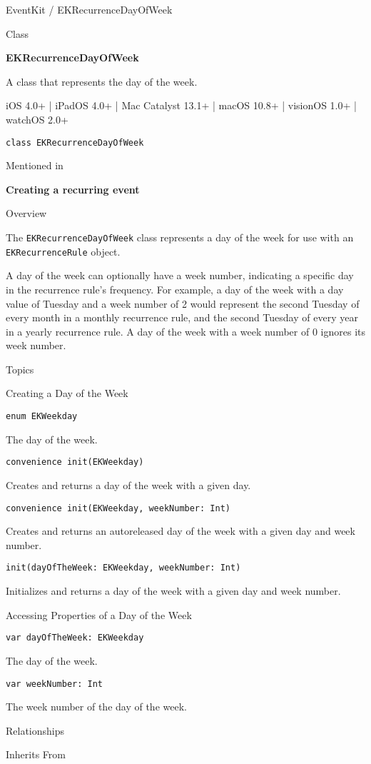 \documentclass{article}
\title{}
\author{}
\date{}
\begin{document}
EventKit / EKRecurrenceDayOfWeek

Class

\textbf{EKRecurrenceDayOfWeek}

A class that represents the day of the week.

iOS 4.0+ | iPadOS 4.0+ | Mac Catalyst 13.1+ | macOS 10.8+ | visionOS 1.0+ | watchOS 2.0+

\texttt{class EKRecurrenceDayOfWeek}

Mentioned in

\textbf{Creating a recurring event}

Overview

The \texttt{EKRecurrenceDayOfWeek} class represents a day of the week for use with an \texttt{EKRecurrenceRule} object.

A day of the week can optionally have a week number, indicating a specific day in the recurrence rule's frequency. For example, a day of the week with a day value of Tuesday and a week number of 2 would represent the second Tuesday of every month in a monthly recurrence rule, and the second Tuesday of every year in a yearly recurrence rule. A day of the week with a week number of 0 ignores its week number.

Topics

Creating a Day of the Week

\texttt{enum EKWeekday}

The day of the week.

\texttt{convenience init(EKWeekday)}

Creates and returns a day of the week with a given day.

\texttt{convenience init(EKWeekday, weekNumber: Int)}

Creates and returns an autoreleased day of the week with a given day and week number.

\texttt{init(dayOfTheWeek: EKWeekday, weekNumber: Int)}

Initializes and returns a day of the week with a given day and week number.

Accessing Properties of a Day of the Week

\texttt{var dayOfTheWeek: EKWeekday}

The day of the week.

\texttt{var weekNumber: Int}

The week number of the day of the week.

Relationships

Inherits From
\end{document}
